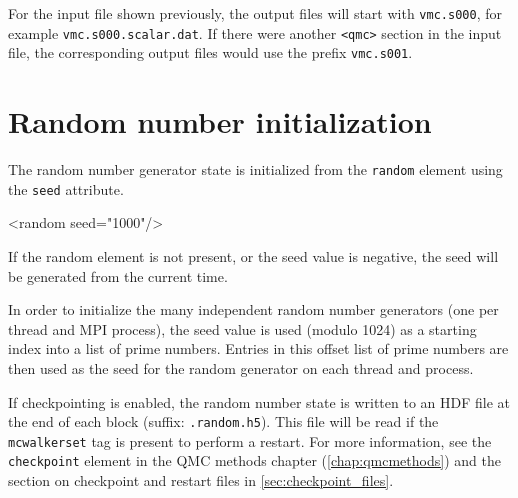 For the input file shown previously, the output files will start with \texttt{vmc.s000}, for example \texttt{vmc.s000.scalar.dat}.
If there were another \texttt{<qmc>} section in the input file, the corresponding output files would use the prefix \texttt{vmc.s001}.



\section{Random number initialization}

The random number generator state is initialized from the \texttt{random} element using the \texttt{seed} attribute.
\begin{shade}
<random seed="1000"/>
\end{shade}

If the random element is not present, or the seed value is negative, the seed will be generated from the current time.

In order to initialize the many independent random number generators (one per thread and MPI process), the seed value is used (modulo 1024) as a starting index into a list of prime numbers.
Entries in this offset list of prime numbers are then used as the seed for the random generator on each thread and process.

If checkpointing is enabled, the random number state is written to an HDF file at the end of each block (suffix: \texttt{.random.h5}).
This file will be read if the \texttt{mcwalkerset} tag is present to perform a restart.
For more information, see the \texttt{checkpoint} element in the QMC methods chapter (\ref{chap:qmcmethods}) and the section on checkpoint and restart files in \ref{sec:checkpoint_files}.

